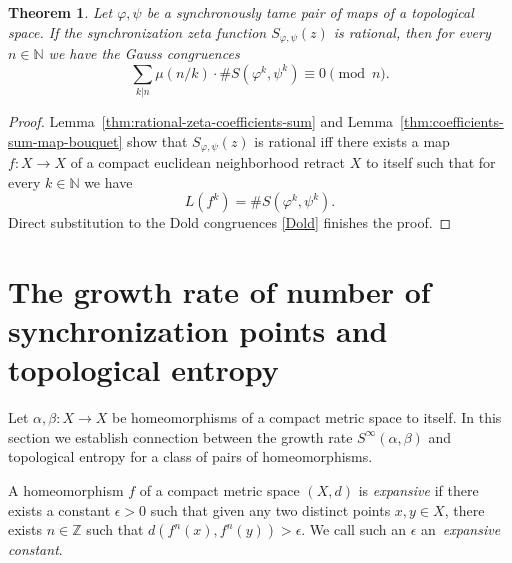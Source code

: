 \documentclass[oneside]{amsart}
\def\N{\mathbb{N}}
\def\Z{\mathbb{Z}}
\newtheorem{thm}{Theorem}
\begin{document}
\begin{thm}\label{thm:rational-congruences}
  Let $\varphi, \psi$ be a synchronously tame pair of
  maps of a topological space.
  If the synchronization zeta function $S_{\varphi, \psi}(z)$ is rational,
  then for every $n \in \N$ we have the Gauss congruences
    \begin{equation*} %
      \sum_{k|n} \mu(n/k) \cdot \# S(\varphi^k, \psi^k) \equiv 0 \pmod n.
    \end{equation*}
\end{thm}
\begin{proof}
  Lemma~\ref{thm:rational-zeta-coefficients-sum} and Lemma~\ref{thm:coefficients-sum-map-bouquet}
  show that $S_{\varphi, \psi}(z)$ is rational iff
  there exists a map $f: X \to X$ of a compact euclidean neighborhood retract $X$ to itself such that
  for every $k \in \N$ we have
  \begin{equation} \label{eq:synchornization=lefschetz}
    L(f^k) = \# S(\varphi^k, \psi^k).
  \end{equation}
  Direct substitution to the Dold congruences \eqref{Dold} finishes the proof.
\end{proof}











\vspace{1cm}

\section{The growth rate of number of synchronization points and topological entropy} \label{sec:entropy}

Let $\alpha, \beta: X \to X$ be homeomorphisms of a compact metric space to itself.
In this section we establish connection between the growth rate $S^\infty(\alpha, \beta)$
and topological entropy for a class of pairs of homeomorphisms.

A homeomorphism $f$ of a compact metric space $(X,d)$ is \emph{expansive} if there exists a constant $\epsilon > 0$
such that given any two distinct points $x, y \in X$, there exists $ n \in \Z$ such that $d(f^n(x), f^n(y)) >\epsilon$.
We call such an $\epsilon$ an~\emph{expansive constant}.
\end{document}
